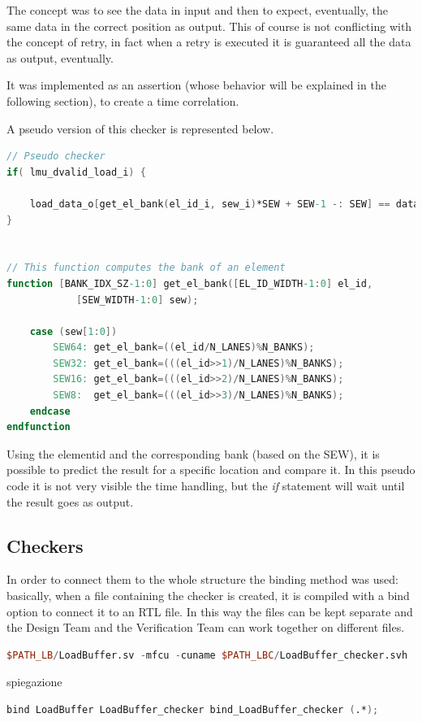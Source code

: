 The concept was to see the data in input and then to expect, eventually, the same data in the correct position as output. This of course is not conflicting with the concept of retry, in fact when a retry is executed it is guaranteed all the data as output, eventually.

It was implemented as an assertion (whose behavior will be explained in the following section), to create a time correlation.

A pseudo version of this checker is represented below.
\bigskip

\linespread{1}

\begin{lstlisting}[language=Verilog,style=verilog-style, backgroundcolor=\color{lyel_palette}, frame=tlb]
// Pseudo checker
if( lmu_dvalid_load_i) { 

    load_data_o[get_el_bank(el_id_i, sew_i)*SEW + SEW-1 -: SEW] == data_i;
}


// This function computes the bank of an element
function [BANK_IDX_SZ-1:0] get_el_bank([EL_ID_WIDTH-1:0] el_id,
            [SEW_WIDTH-1:0] sew);
            
    case (sew[1:0])
        SEW64: get_el_bank=((el_id/N_LANES)%N_BANKS); 
        SEW32: get_el_bank=(((el_id>>1)/N_LANES)%N_BANKS); 
        SEW16: get_el_bank=(((el_id>>2)/N_LANES)%N_BANKS); 
        SEW8:  get_el_bank=(((el_id>>3)/N_LANES)%N_BANKS); 
    endcase
endfunction

\end{lstlisting}

\linespread{1.2}
\bigskip

Using the element\+id and the corresponding bank (based on the SEW), it is possible to predict the result for a specific location and compare it. In this pseudo code it is not very visible the time handling, but the \emph{if} statement will wait until the result goes as output.


\subsection{Checkers}
In order to connect them to the whole structure the binding method was used: basically, when a file containing the checker is created, it is compiled with a bind option to connect it to an RTL file. In this way the files can be kept separate and the Design Team and the Verification Team can work together on different files. \cite{binding}

\begin{lstlisting}[language=Verilog,style=verilog-style, backgroundcolor=\color{lyel_palette}, frame=l, numbers=none]
$PATH_LB/LoadBuffer.sv -mfcu -cuname $PATH_LBC/LoadBuffer_checker.svh
\end{lstlisting}
spiegazione
\begin{lstlisting}[language=Verilog,style=verilog-style, backgroundcolor=\color{lyel_palette}, frame=l, numbers=none]
bind LoadBuffer LoadBuffer_checker bind_LoadBuffer_checker (.*);
\end{lstlisting}


